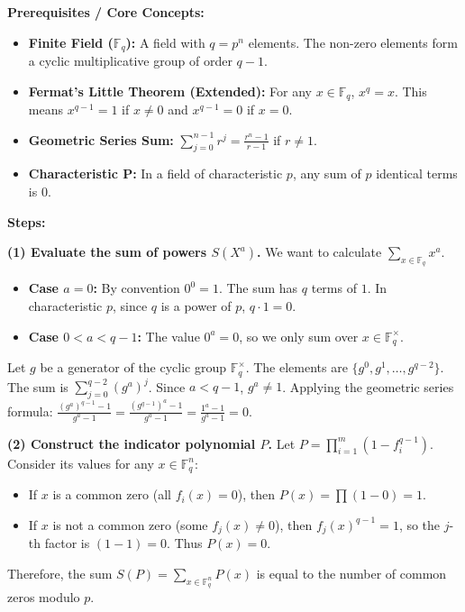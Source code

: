 \begin{solution}
\textbf{Prerequisites / Core Concepts:}
\begin{itemize}
    \item \textbf{Finite Field ($\mathbb{F}_q$):} A field with $q = p^n$ elements. The non-zero elements form a cyclic multiplicative group of order $q-1$.
    \item \textbf{Fermat's Little Theorem (Extended):} For any $x \in \mathbb{F}_q$, $x^q = x$. This means $x^{q-1} = 1$ if $x \neq 0$ and $x^{q-1} = 0$ if $x = 0$.
    \item \textbf{Geometric Series Sum:} $\sum_{j=0}^{n-1} r^j = \frac{r^n - 1}{r - 1}$ if $r \neq 1$.
    \item \textbf{Characteristic P:} In a field of characteristic $p$, any sum of $p$ identical terms is $0$.
\end{itemize}

\textbf{Steps:}

\textbf{(1) Evaluate the sum of powers $S(X^a)$.}
We want to calculate $\sum_{x \in \mathbb{F}_q} x^a$.
\begin{itemize}
    \item \textbf{Case $a = 0$:} By convention $0^0 = 1$. The sum has $q$ terms of $1$. In characteristic $p$, since $q$ is a power of $p$, $q \cdot 1 = 0$.
    \item \textbf{Case $0 < a < q - 1$:} The value $0^a = 0$, so we only sum over $x \in \mathbb{F}_q^\times$.
\end{itemize}
  Let $g$ be a generator of the cyclic group $\mathbb{F}_q^\times$. The elements are $\{g^0, g^1, \dots, g^{q-2}\}$.
  The sum is $\sum_{j=0}^{q-2} (g^a)^j$. Since $a < q-1$, $g^a \neq 1$.
  Applying the geometric series formula: $\frac{(g^a)^{q-1} - 1}{g^a - 1} = \frac{(g^{q-1})^a - 1}{g^a - 1} = \frac{1^a - 1}{g^a - 1} = 0$.

\textbf{(2) Construct the indicator polynomial $P$.}
Let $P = \prod_{i=1}^m (1 - f_i^{q-1})$. Consider its values for any $x \in \mathbb{F}_q^n$:
\begin{itemize}
    \item If $x$ is a common zero (all $f_i(x) = 0$), then $P(x) = \prod (1 - 0) = 1$.
    \item If $x$ is not a common zero (some $f_j(x) \neq 0$), then $f_j(x)^{q-1} = 1$, so the $j$-th factor is $(1 - 1) = 0$. Thus $P(x) = 0$.
\end{itemize}
Therefore, the sum $S(P) = \sum_{x \in \mathbb{F}_q^n} P(x)$ is equal to the number of common zeros modulo $p$.


\end{solution}
